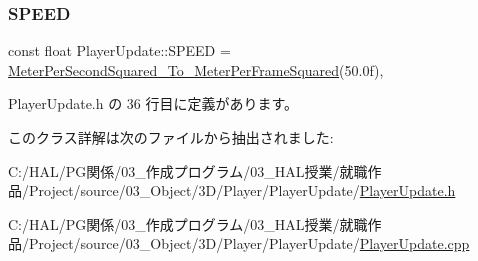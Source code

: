 \subsubsection{\texorpdfstring{S\+P\+E\+ED}{SPEED}}
{\footnotesize\ttfamily const float Player\+Update\+::\+S\+P\+E\+ED = \mbox{\hyperlink{_meter_to_frame_8h_a3a2c155748ceb2eab2a3c303ae48ecc0}{Meter\+Per\+Second\+Squared\+\_\+\+To\+\_\+\+Meter\+Per\+Frame\+Squared}}(50.\+0f)\hspace{0.3cm}{\ttfamily [static]}, {\ttfamily [private]}}



 Player\+Update.\+h の 36 行目に定義があります。



このクラス詳解は次のファイルから抽出されました\+:\begin{DoxyCompactItemize}
\item 
C\+:/\+H\+A\+L/\+P\+G関係/03\+\_\+作成プログラム/03\+\_\+\+H\+A\+L授業/就職作品/\+Project/source/03\+\_\+\+Object/3\+D/\+Player/\+Player\+Update/\mbox{\hyperlink{_player_update_8h}{Player\+Update.\+h}}\item 
C\+:/\+H\+A\+L/\+P\+G関係/03\+\_\+作成プログラム/03\+\_\+\+H\+A\+L授業/就職作品/\+Project/source/03\+\_\+\+Object/3\+D/\+Player/\+Player\+Update/\mbox{\hyperlink{_player_update_8cpp}{Player\+Update.\+cpp}}\end{DoxyCompactItemize}
